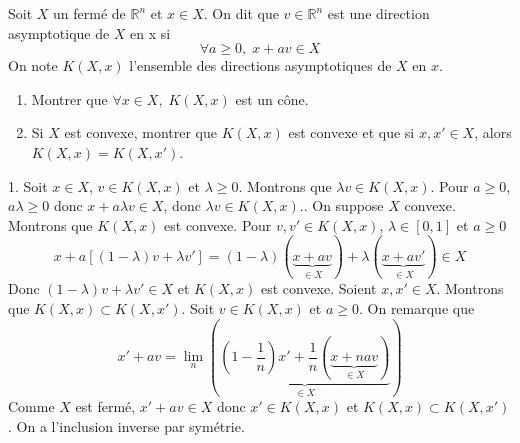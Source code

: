 \documentclass{fancybook}
\begin{document}
\begin{exercice}
Soit $X$ un fermé de $\mathbb R^n$ et $x\in X$. On dit que $v\in \mathbb R^n$ est une direction asymptotique de $X$ en x si $$\forall a\geq 0,\; x+av\in X$$ On note $K(X,x)$ l'ensemble des directions asymptotiques de $X$ en $x$.
\begin{enumerate}
\item Montrer que $\forall x\in X, \; K(X,x)$ est un cône.
\item Si $X$ est convexe, montrer que $K(X,x)$ est convexe et que si $x,x'\in X$, alors $K(X,x)=K(X,x')$.
\end{enumerate}
\end{exercice}
1. Soit $x\in X$, $v\in K(X,x)$ et $\lambda\geq 0$. Montrons que $\lambda v\in K(X,x)$. Pour $a\geq 0$, $a\lambda \geq 0$ donc $x+a\lambda v\in X$, donc $\lambda v\in K(X,x)$.\newline {}. On suppose $X$ convexe. Montrons que $K(X,x)$ est convexe. Pour $v,v'\in K(X,x)$, $\lambda\in [0,1]$ et $a\geq 0$ $$x+a[(1-\lambda)v + \lambda v'] = (1-\lambda)(\underbrace{x+av}_{\in X}) + \lambda(\underbrace{x+av'}_{\in X})\in X$$
Donc $(1-\lambda)v + \lambda v'\in X$ et $K(X,x)$ est convexe.\newline \newline
Soient $x,x'\in X$. Montrons que $K(X,x) \subset K(X,x')$. Soit $v\in K(X,x)$ et $a\geq 0$. On remarque que 
$$ x' + av = \lim_n \left( \underbrace{\left( 1-\dfrac 1n\right)x' + \dfrac{1}{n}(\underbrace{x+nav}_{\in X})}_{\in X}\right) $$
Comme $X$ est fermé, $x' + av \in X$ donc $x'\in K(X,x)$ et $K(X,x) \subset K(X,x')$.\newline
On a l'inclusion inverse par symétrie.

\begin{exercice}

\end{exercice}
\noindent
\end{document}

